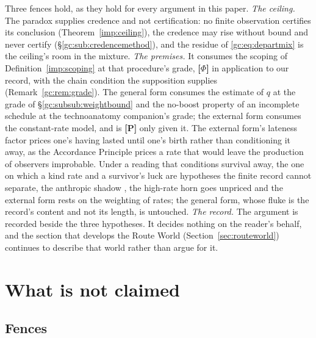 \begin{remark}
\label{gc:rem:departuresfences}
Three fences hold, as they hold for every argument in this paper.
\emph{The ceiling.} The paradox supplies credence and not
certification: no finite observation certifies its conclusion
(Theorem~\ref{imp:ceiling}), the credence may rise without bound and
never certify (\S\ref{gc:sub:credencemethod}), and the residue of
\eqref{gc:eq:departmix} is the ceiling's room in the mixture.
\emph{The premises.} It consumes the scoping of
Definition~\ref{imp:scoping} at that procedure's grade, \textbf{[$\Phi$]}
in application to our record, with the chain condition the supposition
supplies (Remark~\ref{gc:rem:grade}). The general form consumes the
estimate of $q$ at the grade of \S\ref{gc:subsub:weightbound} and the
no-boost property of an incomplete schedule at the technoanatomy
companion's grade; the external form consumes the constant-rate model,
and is \textbf{[P]} only given it. The external form's lateness factor
prices one's having lasted until one's birth rather than conditioning it
away, as the Accordance Principle prices a rate that would leave the
production of observers improbable. Under a reading that conditions
survival away, the one on which a kind rate and a survivor's luck are
hypotheses the finite record cannot separate, the anthropic shadow
\cite{CSB10}, the high-rate horn goes unpriced and the external form
rests on the weighting of rates; the general form, whose fluke is the
record's content and not its length, is untouched. \emph{The record.}
The argument is recorded beside the three
hypotheses. It decides nothing on the reader's behalf, and the section
that develops the Route World (Section~\ref{sec:routeworld}) continues to
describe that world rather than argue for it.
\end{remark}

\section{What is not claimed}\label{sec:fences}

\subsection{Fences}\label{gc:sub:routefences}

